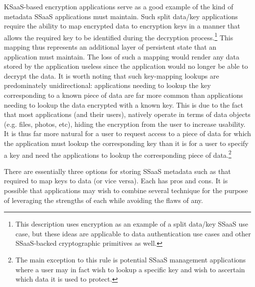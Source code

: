 KSaaS-based encryption applications serve as a good example of the
kind of metadata SSaaS applications must maintain. Such split data/key
applications require the ability to map encrypted data to encryption
keys in a manner that allows the required key to be identified during
the decryption process.\footnote{This description uses encryption as
  an example of a split data/key SSaaS use case, but these ideas are
  applicable to data authentication use cases and other SSaaS-backed
  cryptographic primitives as well.} This mapping thus represents an
additional layer of persistent state that an application must
maintain. The loss of such a mapping would render any data stored by
the application useless since the application would no longer be able
to decrypt the data. It is worth noting that such key-mapping lookups
are predominately unidirectional: applications needing to lookup the
key corresponding to a known piece of data are far more common than
applications needing to lookup the data encrypted with a known
key. This is due to the fact that most applications (and their users),
natively operate in terms of data objects (e.g. files, photos, etc),
hiding the encryption from the user to increase usability. It is thus
far more natural for a user to request access to a piece of data for
which the application must lookup the corresponding key than it is for
a user to specify a key and need the applications to lookup the
corresponding piece of data.\footnote{The main exception to this rule
  is potential SSaaS management applications where a user may in fact
  wish to lookup a specific key and wish to ascertain which data it is
  used to protect.}

There are essentially three options for storing SSaaS metadata such as
that required to map keys to data (or vice versa). Each has pros and
cons. It is possible that applications may wish to combine several
technique for the purpose of leveraging the strengths of each while
avoiding the flaws of any.

